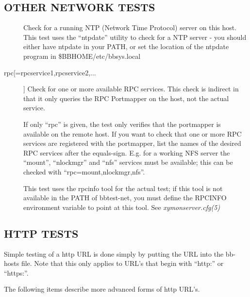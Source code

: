 \subsection{OTHER NETWORK TESTS}
\begin{description}
\item[] Check for a running NTP (Network Time Protocol) server on
  this host. This test uses the ``ntpdate'' utility to check for a NTP
  server - you should either have ntpdate in your PATH, or set the
  location of the ntpdate program in \$BBHOME/etc/bbsys.local 


\item[rpc[=rpcservice1,rpcservice2,...]] Check for one or more
  available RPC services. This check is indirect in that it only
  queries the RPC Portmapper on the host, not the actual service. 


  If only ``rpc'' is given, the test only verifies that the portmapper
  is available on the remote host. If you want to check that one or
  more RPC services are registered with the portmapper, list the names
  of the desired RPC services after the equals-sign. E.g. for a
  working NFS server the ``mount'', ``nlockmgr'' and ``nfs'' services
  must be available; this can be checked with
  ``rpc=mount,nlockmgr,nfs''. 



  This test uses the rpcinfo tool for the actual test; if this tool is
  not available in the PATH of bbtest-net, you must define the RPCINFO
  environment variable to point at this tool. See
  \emph{xymonserver.cfg(5)}


\end{description}
\subsection{HTTP TESTS}
 Simple testing of a http URL is done simply by putting the URL into
 the bb-hosts file. Note that this only applies to URL's that begin
 with ``http:'' or ``https:''. 


  The following items describe more advanced forms of http URL's. 


